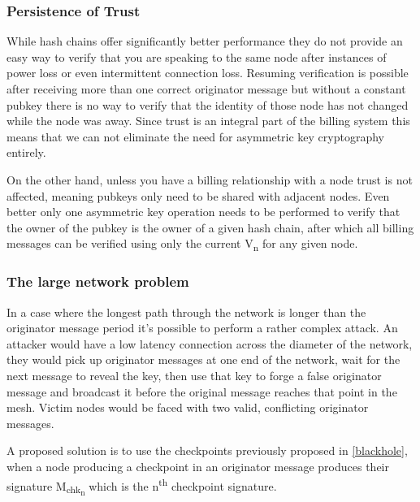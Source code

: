 \documentclass[11pt]{article}
\begin{document}
               \subsubsection{Persistence of Trust}
               
                      While hash chains offer significantly better performance they do not provide an easy way to verify that you are speaking to the same node after instances of power loss or even intermittent connection loss. Resuming verification is possible after receiving more than one correct originator message but without a constant pubkey there is no way to verify that the identity of those node has not changed while the node was away. Since trust is an integral part of the billing system this means that we can not eliminate the need for asymmetric key cryptography entirely. 
                      
                      On the other hand, unless you have a billing relationship with a node trust is not affected, meaning pubkeys only need to be shared with adjacent nodes. Even better only one asymmetric key operation needs to be performed to verify that the owner of the pubkey is the owner of a given hash chain, after which all billing messages can be verified using only the current V\textsubscript{n} for any given node.
               
               \subsubsection{The large network problem}
                        
                        In a case where the longest path through the network is longer than the originator message period it's possible to perform a rather complex attack. An attacker would have a low latency connection across the diameter of the network, they would pick up originator messages at one end of the network, wait for the next message to reveal the key, then use that key to forge a false originator message and broadcast it before the original message reaches that point in the mesh. Victim nodes would be faced with two valid, conflicting originator messages.
                        
                        A proposed solution is to use the checkpoints previously proposed in \ref{blackhole}, when a node producing a checkpoint in an originator message produces their signature M\textsubscript{chk\textsubscript{n}} which is the n\textsuperscript{th} checkpoint signature.
                        
\end{document}
